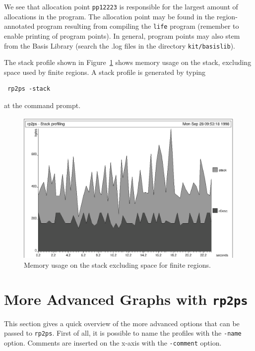 \documentclass[12pt]{book}
\begin{document}
We see that allocation point \texttt{pp12223} is responsible for the
largest amount of allocations in the program. The allocation point may
be found in the region-annotated program resulting from compiling the
{\tt life} program (remember to enable printing of program points). In
general, program points may also stem from the Basis Library (search
the {.log} files in the directory {\tt kit/basislib}).

The stack profile shown in Figure~\ref{prof_eks3.fig} shows memory
usage on the stack, excluding space used by finite regions. A 
%
%
stack profile is generated by typing
\begin{verbatim}
 rp2ps -stack
\end{verbatim}
at the command prompt.

\begin{figure}
\begin{center}
\includegraphics{prof_eks3.ps}
\end{center}
\caption{Memory usage on the stack excluding space for finite regions.}
\label{prof_eks3.fig}
\end{figure}

\section{More Advanced Graphs with \texttt{rp2ps}}
This section gives a quick overview of the more advanced options that can
be passed to \texttt{rp2ps}. First of all, it is possible to name the
profiles with the 
%
{\tt -name} option. Comments are inserted on the
x-axis with the 
%
{\tt -comment} option.
\end{document}
